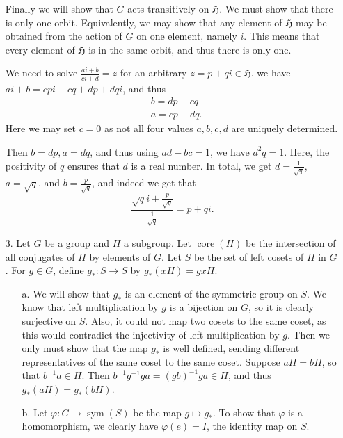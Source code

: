 \documentclass[11pt, reqno]{article}
\theoremstyle{plain}
\theoremstyle{definition}
\theoremstyle{remark}
\renewcommand{\phi}{\varphi}
\begin{document}
\begin{enumerate}
    Finally we will show that $G$ acts transitively on $\mathfrak{H}$. We must show that there is only one orbit. 
    Equivalently, we may show that any element of $\mathfrak{H}$ may be obtained from the action of $G$ on one element,
    namely $i$. This means that every element of $\mathfrak{H}$ is in the same orbit, and thus there is only one. 

    We need to solve $\frac{ai + b}{ci + d} = z$ for an arbitrary $z = p + qi \in \mathfrak{H}$. we have 
    $ai + b = cpi - cq + dp + dqi$, and thus 
    \begin{align*}
        &b = dp - cq\\
        &a = cp + dq.
    \end{align*}
    Here we may set $c = 0$ as not all four values $a, b, c, d$ are uniquely determined. 

    Then $b = dp, a = dq$, and thus using $ad - bc = 1$, we have $d^2q = 1$. Here, the positivity of $q$ 
    ensures that $d$ is a real number. In total, we get $d = \frac{1}{\sqrt{q}}$, $a = \sqrt{q}$, and $b = \frac{p}{\sqrt{q}}$,
    and indeed we get that 
    \[
        \frac{\sqrt{q}i + \frac{p}{\sqrt{q}}}{\frac{1}{\sqrt{q}}} = p + qi.
    \]

    \item[3.] Let $G$ be a group and $H$ a subgroup. Let $\operatorname{core}(H)$ be the 
    intersection of all conjugates of $H$ by elements of $G$. Let $S$ be the set of left cosets 
    of $H$ in $G$. For $g \in G$, define $g_*: S \rightarrow S$ by $g_*(xH) = gxH$.
    \begin{enumerate}
        \item[a.] We will show that $g_*$ is an element of the symmetric group on $S$. We know 
        that left multiplication by $g$ is a bijection on $G$, so it is clearly surjective 
        on $S$. Also, it could not map two cosets to the same coset, as this would
        contradict the injectivity of left multiplication by $g$. Then we only must show 
        that the map $g_*$ is well defined, sending different representatives of the same coset
        to the same coset. Suppose $aH = bH$, so that $b^{-1}a \in H$. Then $b^{-1}g^{-1}ga = 
        (gb)^{-1}ga \in H$, and thus $g_*(aH) = g_*(bH)$.

        \item[b.] Let $\phi: G \rightarrow \operatorname{sym}(S)$ be the map $g \mapsto g_*$.
        To show that $\phi$ is a homomorphism, we clearly have $\phi(e) = I$, the identity
        map on $S$. 


\end{enumerate}
\end{enumerate}
\end{document}
